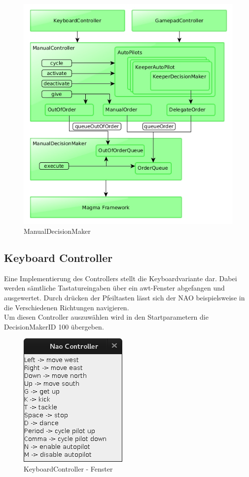 \begin{figure}[H]
	\centering
	\includegraphics[width=\ScaleIfNeeded]{Grafiken/ManualCtrl/ManualDecisionMaker}
	\caption{ManualDecisionMaker}
	\label{KickMetrikAgent}
\end{figure}

\subsection{Keyboard Controller}
Eine Implementierung des Controllers stellt die Keyboardvariante dar. Dabei werden sämtliche Tastatureingaben über ein awt-Fenster abgefangen und ausgewertet. Durch drücken der Pfeiltasten lässt sich der NAO beispielsweise in die Verschiedenen Richtungen navigieren.\\
Um diesen Controller auszuwählen wird in den Startparametern die DecisionMakerID 100 übergeben.

\begin{figure}[H]
	\centering
	\includegraphics[width=\ScaleIfNeeded]{Grafiken/ManualCtrl/KeyboardController}
	\caption{KeyboardController - Fenster}
	\label{fig:keyboardcrtl}
\end{figure}


